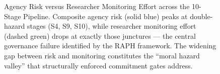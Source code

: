\documentclass[12pt]{article}
\begin{document}
\begin{figure}[p]
\caption{Agency Risk versus Researcher Monitoring Effort across the 10-Stage Pipeline.
Composite agency risk (solid blue) peaks at double-hazard stages (S4, S9, S10), while researcher
monitoring effort (dashed green) drops at exactly those junctures --- the central governance failure
identified by the RAPH framework. The widening gap between risk and monitoring constitutes the
``moral hazard valley'' that structurally enforced commitment gates address.}
\label{fig:findings}
\end{figure}
\end{document}
